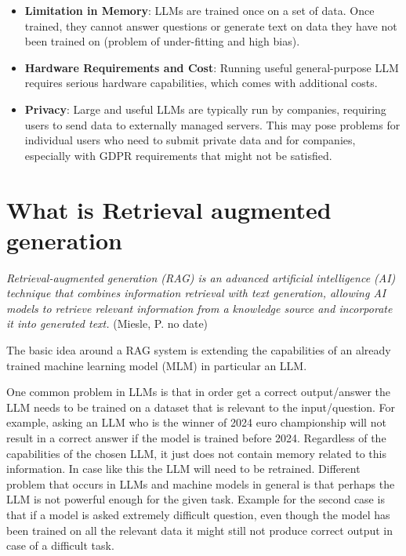 \documentclass{wseas}
\begin{document}
\begin{itemize}

\item
  \textbf{Limitation in Memory}: LLMs are trained once on a set of data.
  Once trained, they cannot answer questions or generate text on data
  they have not been trained on (problem of under-fitting and high
  bias).
\item
  \textbf{Hardware Requirements and Cost}: Running useful
  general-purpose LLM requires serious hardware capabilities, which
  comes with additional costs.
\item
  \textbf{Privacy}: Large and useful LLMs are typically run by
  companies, requiring users to send data to externally managed servers.
  This may pose problems for individual users who need to submit private
  data and for companies, especially with GDPR requirements that might
  not be satisfied.
\end{itemize}


\section{What is Retrieval augmented generation}

\emph{Retrieval-augmented generation (RAG) is an advanced
 artificial intelligence (AI) technique that combines information 
 retrieval with text generation, allowing AI models to retrieve 
 relevant information from a knowledge source and incorporate it 
 into generated text.} (Miesle, P. no date) \cite{cite6}


The basic idea around a RAG system is extending the capabilities of an
already trained machine learning model (MLM) in particular an LLM.

One common problem in LLMs is that in order get a correct output/answer
the LLM needs to be trained on a dataset that is relevant to the
input/question. For example, asking an LLM who is the winner of 2024
euro championship will not result in a correct answer if the model is
trained before 2024. Regardless of the capabilities of the chosen LLM,
it just does not contain memory related to this information. In case
like this the LLM will need to be retrained. Different problem that
occurs in LLMs and machine models in general is that perhaps the LLM is
not powerful enough for the given task. Example for the second case is
that if a model is asked extremely difficult question, even though the
model has been trained on all the relevant data it might still not
produce correct output in case of a difficult task.
\end{document}
